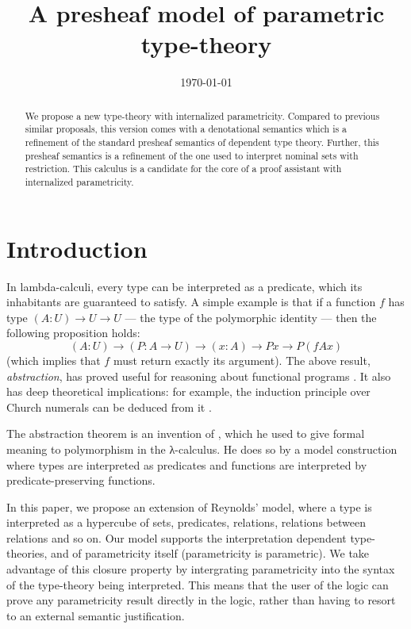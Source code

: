 \documentclass[english]{PaperTools/latex/lipics}
\title{A presheaf model of parametric type-theory}
\author{}
\date{\today}
\begin{document}
\maketitle

\begin{abstract}
  We propose a new type-theory with internalized
  parametricity. Compared to previous similar proposals, this version
  comes with a denotational semantics which is a refinement of the
  standard presheaf semantics of dependent type theory. Further, this
  presheaf semantics is a refinement of the one used to interpret
  nominal sets with restriction.  This calculus is a candidate for the
  core of a proof assistant with internalized parametricity.
\end{abstract}

\section{Introduction}
In lambda-calculi, every type can be interpreted as a predicate, which
its inhabitants are guaranteed to satisfy.
%
A simple example is that if a function $f$ has type $(A : U) → U → U$ ---
the type of the polymorphic identity --- then the following
proposition holds:
%
\[
  (A : U) → (P : A → U) → (x : A) → P x → P (f A x)
\]
%
(which implies that $f$ must return exactly its argument).
The above result, \emph{abstraction}, has proved useful for reasoning
about functional programs \citep{wadler_theorems_1989}. It also has deep
theoretical implications: for example, the induction principle over Church numerals
can be deduced from it \citep{wadler_girardreynolds_2007}.


The abstraction theorem is an invention of
\citet{reynolds_types_1983}, which he used to give formal meaning to
polymorphism in the λ-calculus. He does so by a model construction
where types are interpreted as predicates and functions are interpreted
by predicate-preserving functions.

In this paper, we propose an extension of Reynolds' model, where a
type is interpreted as a hypercube of sets, predicates, relations,
relations between relations and so on. Our model
supports the interpretation dependent type-theories, and of
parametricity itself (parametricity is parametric).  We take advantage of this
closure property by intergrating parametricity into the syntax of the
type-theory being interpreted.  This means that the user of the logic
can prove any parametricity result directly in the logic, rather than
having to resort to an external semantic justification.
\end{document}
